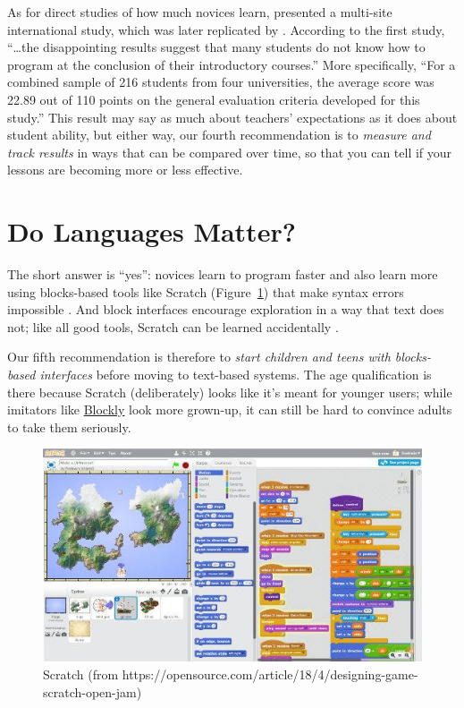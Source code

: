 As for direct studies of how much novices learn, \cite{McCr2001}
presented a multi-site international study, which was later replicated
by \cite{Utti2013}. According to the first study, ``\ldots{}the
disappointing results suggest that many students do not know how to
program at the conclusion of their introductory courses.'' More
specifically, ``For a combined sample of 216 students from four
universities, the average score was 22.89 out of 110 points on the
general evaluation criteria developed for this study.'' This result may
say as much about teachers' expectations as it does about student
ability, but either way, our fourth recommendation is to \emph{measure and
track results} in ways that can be compared over time, so that you can
tell if your lessons are becoming more or less effective.

\section{Do Languages Matter?}\label{s:pck-language}

The short answer is ``yes'': novices learn to program faster and also
learn more using blocks-based tools like Scratch
(Figure~\ref{f:pck-scratch}) that make syntax errors impossible
\cite{Wein2017b}. And block interfaces encourage exploration in a way
that text does not; like all good tools, Scratch can be learned
accidentally \cite{Malo2010}.

Our fifth recommendation is therefore to \emph{start children and teens
with blocks-based interfaces} before moving to text-based systems. The
age qualification is there because Scratch (deliberately) looks like
it's meant for younger users; while imitators like \href{https://developers.google.com/blockly/}{Blockly}
look more grown-up, it can still be hard to convince adults to take
them seriously.

\begin{figure}
\centering
\includegraphics{../../figures/scratch.jpg}
\caption{Scratch (from https://opensource.com/article/18/4/designing-game-scratch-open-jam)}
\label{f:pck-scratch}
\end{figure}

